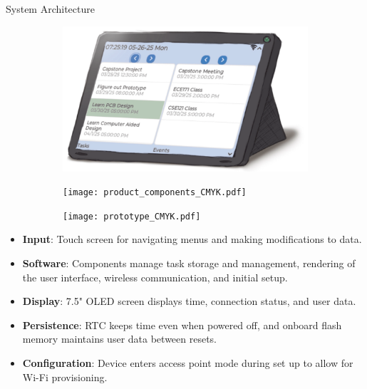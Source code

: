 \documentclass[final, cmyk]{beamer}
\newlength{\colwidth}
\begin{document}
\begin{frame}[t]
\begin{columns}[t]
\begin{column}{\colwidth}
      \begin{block}{System Architecture}

        \begin{figure}
          \begin{subfigure}[t]{0.6\textwidth}
              \includegraphics[width =\textwidth]{aestheticRender_CMYK.pdf}
          \end{subfigure}
          \begin{subfigure}[t]{0.54\textwidth}
              \texttt{[image: product\_components\_CMYK.pdf]}
          \end{subfigure}
          \begin{subfigure}[t]{0.44\textwidth}
              \texttt{[image: prototype\_CMYK.pdf]}
          \end{subfigure}
        \end{figure}

        \begin{itemize}
          \item \textbf{Input}: Touch screen for navigating menus and
            making modifications to data.
          \item \textbf{Software}: Components manage task storage and
            management, rendering of the user interface, wireless
            communication, and initial setup.
          \item \textbf{Display}: 7.5" OLED screen displays time, connection status,
            and user data.
          \item \textbf{Persistence}: RTC keeps time even 
            when powered off, and onboard flash memory maintains user data
            between resets.
          \item \textbf{Configuration}: Device enters access point mode during set up to allow for Wi-Fi provisioning.
        \end{itemize}
      \end{block}
    \end{column}


\end{columns}
\end{frame}
\end{document}
